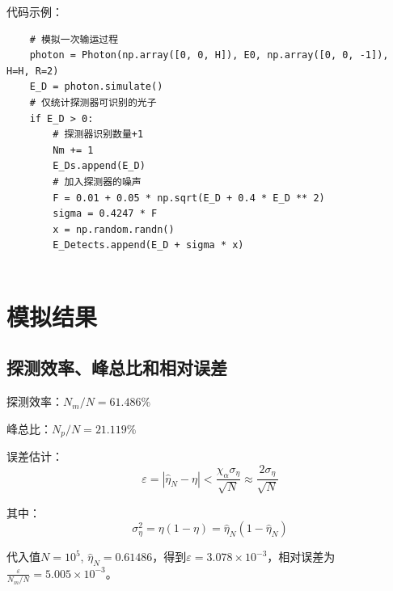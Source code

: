 \documentclass[UTF8, a4paper]{ctexart}
\begin{document}
代码示例：
\begin{lstlisting}
    # 模拟一次输运过程
    photon = Photon(np.array([0, 0, H]), E0, np.array([0, 0, -1]), H=H, R=2)
    E_D = photon.simulate()
    # 仅统计探测器可识别的光子
    if E_D > 0:
        # 探测器识别数量+1 
        Nm += 1
        E_Ds.append(E_D)
        # 加入探测器的噪声
        F = 0.01 + 0.05 * np.sqrt(E_D + 0.4 * E_D ** 2)
        sigma = 0.4247 * F
        x = np.random.randn()
        E_Detects.append(E_D + sigma * x)   
        
\end{lstlisting}

\section{模拟结果}

\subsection{探测效率、峰总比和相对误差}
探测效率：$N_m/N=61.486\%$

峰总比：$N_p/N=21.119\%$

误差估计：
\[
    \varepsilon=\left|\hat{\eta}_N-\eta\right|<\frac{\chi_\alpha \sigma_\eta}{\sqrt{N}} \approx \frac{2 \sigma_\eta}{\sqrt{N}}
\]

其中：
\[
    \sigma_\eta^2=\eta(1-\eta)=\hat{\eta}_N\left(1-\hat{\eta}_N\right)
\]

代入值$N=10^5$, $\hat{\eta}_N=0.61486$，得到$\varepsilon=3.078\times10^{-3}$，相对误差为$\frac{\varepsilon}{N_m/N}=5.005\times10^{-3}$。
\end{document}
